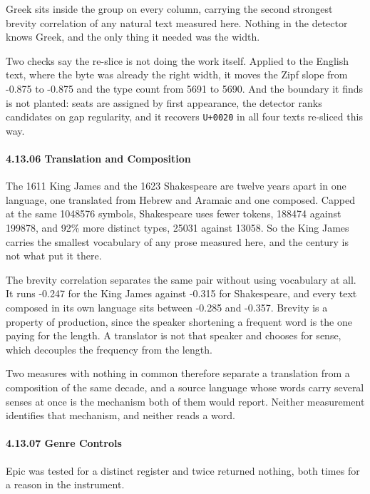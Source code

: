 Greek sits inside the group on every column, carrying the second strongest brevity correlation of any natural text measured here. Nothing in the detector knows Greek, and the only thing it needed was the width.

Two checks say the re-slice is not doing the work itself. Applied to the English text, where the byte was already the right width, it moves the Zipf slope from -0.875 to -0.875 and the type count from 5691 to 5690. And the boundary it finds is not planted: seats are assigned by first appearance, the detector ranks candidates on gap regularity, and it recovers \texttt{U+0020} in all four texts re-sliced this way.

\paragraph{4.13.06 Translation and Composition}

The 1611 King James and the 1623 Shakespeare are twelve years apart in one language, one translated from Hebrew and Aramaic and one composed. Capped at the same 1048576 symbols, Shakespeare uses fewer tokens, 188474 against 199878, and 92\% more distinct types, 25031 against 13058. So the King James carries the smallest vocabulary of any prose measured here, and the century is not what put it there.

The brevity correlation separates the same pair without using vocabulary at all. It runs -0.247 for the King James against -0.315 for Shakespeare, and every text composed in its own language sits between -0.285 and -0.357. Brevity is a property of production, since the speaker shortening a frequent word is the one paying for the length. A translator is not that speaker and chooses for sense, which decouples the frequency from the length.

Two measures with nothing in common therefore separate a translation from a composition of the same decade, and a source language whose words carry several senses at once is the mechanism both of them would report. Neither measurement identifies that mechanism, and neither reads a word.

\paragraph{4.13.07 Genre Controls}

Epic was tested for a distinct register and twice returned nothing, both times for a reason in the instrument.

